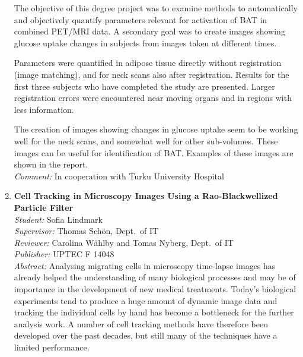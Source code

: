 \begin{small}
\begin{enumerate}
The objective of this degree project was to examine methods to automatically and objectively quantify parameters relevant for activation of BAT in combined PET/MRI data. A secondary goal was to create images showing glucose uptake changes in subjects from images taken at different times.

Parameters were quantified in adipose tissue directly without registration (image matching), and for neck scans also after registration. Results for the first three subjects who have completed the study are presented. Larger registration errors were encountered near moving organs and in regions with less information.

The creation of images showing changes in glucose uptake seem to be working well for the neck scans, and somewhat well for other sub-volumes. These images can be useful for identification of BAT. Examples of these images are shown in the report.\\
\emph{Comment: }In cooperation with Turku University Hospital

\item\textbf{Cell Tracking in Microscopy Images Using a Rao-Blackwellized Particle Filter}\\
  \emph{Student:} Sofia Lindmark\\
  \emph{Supervisor:} Thomas Schön, Dept.~of IT\\
  \emph{Reviewer:} Carolina Wählby and Tomas Nyberg, Dept.~of IT \\
  \emph{Publisher:} UPTEC F 14048\\
  \emph{Abstract:} Analysing migrating cells in microscopy time-lapse images has already helped the understanding of many biological processes and may be of importance in the development of new medical treatments. Today’s biological experiments tend to produce a huge amount of dynamic image data and tracking the individual cells by hand has become a bottleneck for the further analysis work. A number of cell tracking methods have therefore been developed over the past decades, but still many of the techniques have a limited performance.


\end{enumerate}
\end{small}
